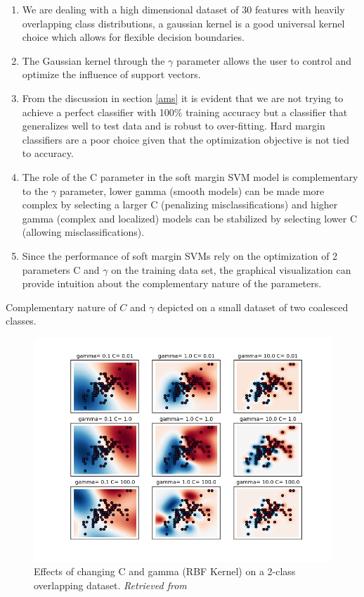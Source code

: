\documentclass[final,3p,times,twocolumn]{elsarticle}
\begin{document}
\begin{enumerate}
\item{We are dealing with a high dimensional dataset of 30 features with heavily overlapping class distributions, a gaussian kernel is a good universal kernel choice which allows for flexible decision boundaries.}
\item{The Gaussian kernel through the $\gamma$ parameter allows the user to control and optimize the influence of support vectors.}
\item{From the discussion in section \ref{ams} it is evident that we are not trying to achieve a perfect classifier with 100$\%$ training accuracy but a classifier that generalizes well to test data and is robust to over-fitting. Hard margin classifiers are a poor choice given that the optimization objective is not tied to accuracy.}
\item{The role of the C parameter in the soft margin SVM model is complementary to the $\gamma$ parameter, lower gamma (smooth models) can be made more complex by selecting a larger C (penalizing misclassifications) and higher gamma (complex and localized) models can be stabilized by selecting lower C (allowing misclassifications).}
\item{Since the performance of soft margin SVMs rely on the optimization of 2 parameters C and $\gamma$ on the training data set, the graphical visualization can provide intuition about the complementary nature of the parameters.}
\end{enumerate} 

Complementary nature of $C$ and $\gamma$ depicted on a small dataset of two coalesced classes. 

\begin{figure}
\hspace{-0.7cm}
\includegraphics[scale=0.5]{Images/RBF_Params.png} 
\caption{Effects of changing C and gamma (RBF Kernel) on a 2-class overlapping dataset. \textit{Retrieved from \cite{PyRBF}}}
\label{c_gamma}
\end{figure}
\end{document}

